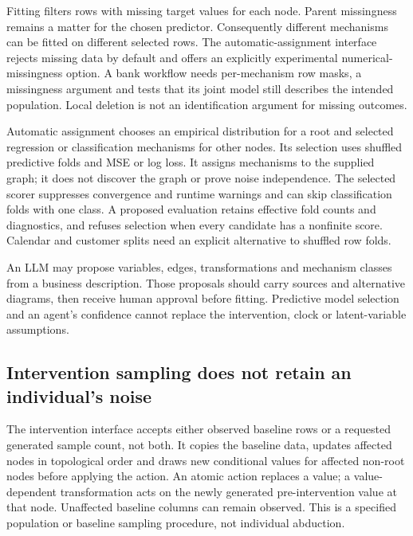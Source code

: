 Fitting filters rows with missing target values for each node. Parent
missingness remains a matter for the chosen predictor. Consequently
different mechanisms can be fitted on different selected rows. The
automatic-assignment interface rejects missing data by default and offers
an explicitly experimental numerical-missingness option. A bank workflow
needs per-mechanism row masks, a missingness argument and tests that its
joint model still describes the intended population. Local deletion is
not an identification argument for missing outcomes.
\citep{exec24_gcm_source,exec24_gcm_choice}

Automatic assignment chooses an empirical distribution for a root and
selected regression or classification mechanisms for other nodes. Its
selection uses shuffled predictive folds and MSE or log loss. It assigns
mechanisms to the supplied graph; it does not discover the graph or prove
noise independence. The selected scorer suppresses convergence and runtime
warnings and can skip classification folds with one class. A proposed
evaluation retains effective fold counts and diagnostics, and refuses
selection when every candidate has a nonfinite score. Calendar and
customer splits need an explicit alternative to shuffled row folds.
\citep{exec24_gcm_source,exec24_gcm_choice}

An LLM may propose variables, edges, transformations and mechanism classes
from a business description. Those proposals should carry sources and
alternative diagrams, then receive human approval before fitting. Predictive
model selection and an agent's confidence cannot replace the intervention,
clock or latent-variable assumptions.~\citep{exec24_gcm_choice}

\subsection{Intervention sampling does not retain an individual's noise}
The intervention interface accepts either observed baseline rows or a
requested generated sample count, not both. It copies the baseline data,
updates affected nodes in topological order and draws new conditional
values for affected non-root nodes before applying the action. An atomic
action replaces a value; a value-dependent transformation acts on the
newly generated pre-intervention value at that node. Unaffected baseline
columns can remain observed. This is a specified population or baseline
sampling procedure, not individual abduction.~\citep{exec24_gcm_source}

